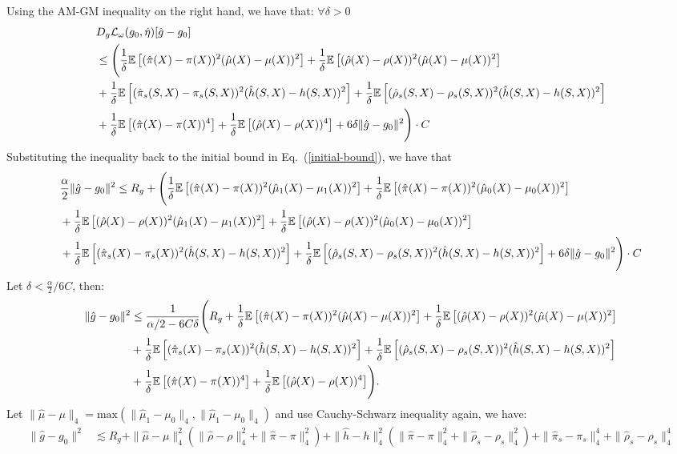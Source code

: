 \documentclass{article}
\theoremstyle{plain}
\theoremstyle{definition}
\theoremstyle{remark}
\newcommand{\E}{\mathbb{E}}                %
\newcommand{\1}{\mathds{1}}                %
\begin{document}
Using the AM-GM inequality on the right hand, we have that: $\forall \delta > 0$ 
\begin{align}
    & D_g\mathcal{L}_\omega(g_0, \hat{\eta})[\hat{g}-g_0] \\
    &\leq \Biggl(\frac{1}{\delta}\E\left[(\hat\pi(X) - \pi(X))^2 (\hat\mu(X) - \mu(X))^2\right] + \frac{1}{\delta} \E\left[(\hat\rho(X) - \rho(X))^2 (\hat\mu(X) - \mu(X))^2\right]\notag \\
    &+ \frac{1}{\delta} \E\left[(\hat\pi_s(S,X) - \pi_s(S,X))^2 (\hat{h}(S,X) - h(S,X))^2\right] + \frac{1}{\delta} \E\left[(\hat\rho_s(S,X) - \rho_s(S,X))^2 (\hat{h}(S,X) - h(S,X))^2\right] \notag \\
    &+\frac{1}{\delta} \E\left[(\hat\pi(X)-\pi(X))^4\right] + \frac{1}{\delta} \E\left[(\hat\rho(X)-\rho(X))^4\right] + 6\delta\|\hat{g}-g_0\|^2 \Biggr) \cdot C
\end{align}
Substituting the inequality back to the initial bound in Eq.~(\ref{initial-bound}), we have that
\begin{align}
    &\frac{\alpha}{2}\|\hat{g}-g_0\|^2 \leq R_g + \Biggl(\frac{1}{\delta}\E\left[(\hat\pi(X) - \pi(X))^2 (\hat\mu_1(X) - \mu_1(X))^2\right] + \frac{1}{\delta} \E\left[(\hat\pi(X) - \pi(X))^2 (\hat\mu_0(X) - \mu_0(X))^2\right] \notag \\
    &+ \frac{1}{\delta} \E\left[(\hat\rho(X) - \rho(X))^2 (\hat\mu_1(X) - \mu_1(X))^2\right] + \frac{1}{\delta} \E\left[(\hat\rho(X) - \rho(X))^2 (\hat\mu_0(X) - \mu_0(X))^2\right] \notag \\
    &+ \frac{1}{\delta} \E\left[(\hat\pi_s(X) - \pi_s(X))^2 (\hat{h}(S,X) - h(S,X))^2\right] + \frac{1}{\delta} \E\left[(\hat\rho_s(S,X) - \rho_s(S,X))^2 (\hat{h}(S,X) - h(S,X))^2\right] + 6\delta\|\hat{g}-g_0\|^2\Biggr) \cdot C
\end{align}
Let $\delta < \frac{\alpha}{2} / 6C$, then:
\begin{align}
    \|\hat{g}-g_0\|^2 &\leq \frac{1}{\alpha/2 - 6C\delta} \Biggl(R_g + \frac{1}{\delta}\E\left[(\hat\pi(X) - \pi(X))^2 (\hat\mu(X) - \mu(X))^2\right] + \frac{1}{\delta} \E\left[(\hat\rho(X) - \rho(X))^2 (\hat\mu(X) - \mu(X))^2\right] \notag \\
    &+\frac{1}{\delta} \E\left[(\hat\pi_s(X) - \pi_s(X))^2 (\hat{h}(S,X) - h(S,X))^2\right]  + \frac{1}{\delta} \E\left[(\hat\rho_s(S,X) - \rho_s(S,X))^2 (\hat{h}(S,X) - h(S,X))^2\right] \notag \\
    &+\frac{1}{\delta} \E\left[(\hat\pi(X)-\pi(X))^4\right] + \frac{1}{\delta} \E\left[(\hat\rho(X)-\rho(X))^4\right] \Biggr).
\end{align}
Let $\|\hat\mu-\mu\|_4=\text{max}(\|\hat\mu_1-\mu_0\|_4, \|\hat\mu_1-\mu_0\|_4)$ and use Cauchy-Schwarz inequality again, we have:
\begin{align}
    \|\hat{g}-g_0\|^2 &\lesssim R_g + \|\hat\mu-\mu\|_4^2(\|\hat\rho-\rho\|_4^2 + \|\hat\pi-\pi\|_4^2) + \|\hat{h}-h\|_4^2( \|\hat\pi-\pi\|_4^2 + \|\hat\rho_s-\rho_s\|_4^2) + \|\hat\pi_s-\pi_s\|_4^4 + \|\hat\rho_s-\rho_s\|_4^4
\end{align}
\newpage
\end{document}
